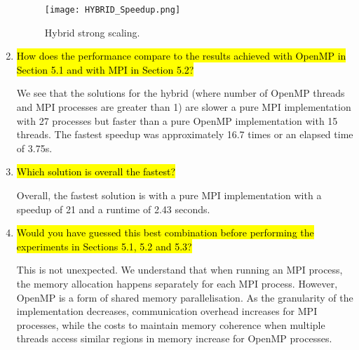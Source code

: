 \documentclass{article}
\begin{document}
\begin{enumerate}
	\begin{figure}[p] %
	 	\begin{center}
	 		\texttt{[image: HYBRID\_Speedup.png]} %
	 		\caption{Hybrid strong scaling.}
	 		\label{fig:hybrid_speedup}
	 	\end{center}
	\end{figure}
	
	\item \hl{How does the performance compare to the results achieved with OpenMP in Section 5.1 and with MPI in Section 5.2?}

	We see that the solutions for the hybrid (where number of OpenMP threads and MPI processes are greater than 1) are slower a pure MPI implementation with 27 processes but faster than a pure OpenMP implementation with 15 threads. The fastest speedup was approximately 16.7 times or an elapsed time of 3.75s. 
	
	\item \hl{Which solution is overall the fastest?}

	Overall, the fastest solution is with a pure MPI implementation with a speedup of 21 and a runtime of 2.43 seconds.
	
	\item \hl{Would you have guessed this best combination before performing the experiments in Sections 5.1, 5.2 and 5.3?}

	This is not unexpected. We understand that when running an MPI process, the memory allocation happens separately for each MPI process. However, OpenMP is a form of shared memory parallelisation. As the granularity of the implementation decreases, communication overhead increases for MPI processes, while the costs to maintain memory coherence when multiple threads access similar regions in memory increase for OpenMP processes.
\end{enumerate}
\end{document}
